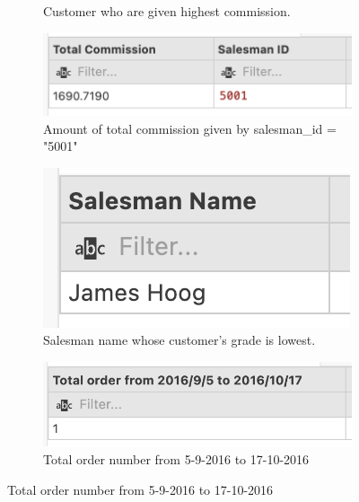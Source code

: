 \begin{figure}[H]
\begin{subfigure}{.5\textwidth}
        \caption*{Customer who are given highest commission.}
        \label{fig:q1}
    \end{subfigure}
    \begin{subfigure}{.5\textwidth}
        \centering
        \includegraphics[width=.8\linewidth]{images/output/q2.png}
        \caption*{Amount of total commission given by salesman\_id = "5001"}
        \label{fig:q2}
    \end{subfigure}
    \begin{subfigure}{.5\textwidth}
        \centering
        \includegraphics[width=.8\linewidth]{images/output/q3.png}
        \caption*{Salesman name whose customer’s grade is lowest.}
        \label{fig:q3}
    \end{subfigure}
    \begin{subfigure}{.5\textwidth}
        \centering
        \includegraphics[width=.8\linewidth]{images/output/q4.png}
        \caption*{Total order number from 5-9-2016 to 17-10-2016}
        \label{fig:q4}
    \end{subfigure}
\end{figure}
